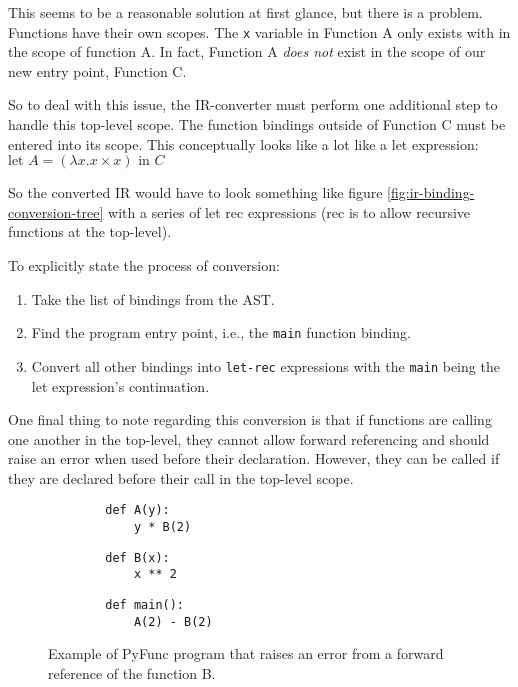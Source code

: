 \documentclass{l4proj}
\begin{document}
This seems to be a reasonable solution at first glance, but there is a problem.
Functions have their own scopes. 
The \texttt{x} variable in Function A only exists with in the scope of function A.
In fact, Function A \emph{does not} exist in the scope of our new entry point, Function C.

So to deal with this issue, the IR-converter must perform one additional step to handle this top-level scope.
The function bindings outside of Function C must be entered into its scope.
This conceptually looks like a lot like a let expression: $\text{let } A = (\lambda x. x \times x) \text{ in } C$

So the converted IR would have to look something like figure \ref{fig:ir-binding-conversion-tree} with a series of let rec expressions (rec is to allow recursive functions at the top-level).

To explicitly state the process of conversion:

\begin{enumerate}
    \item Take the list of bindings from the AST.
    \item Find the program entry point, i.e., the \texttt{main} function binding.
    \item Convert all other bindings into \texttt{let-rec} expressions with the \texttt{main} being the let expression's continuation.
\end{enumerate}

One final thing to note regarding this conversion is that if functions are calling one another in the top-level, they cannot allow forward referencing and should raise an error when used before their declaration.
However, they can be called if they are declared before their call in the top-level scope.

\begin{figure}
\begin{minipage}{0.3\textwidth}
    \begin{lstlisting}
        def A(y):
            y * B(2)
    \end{lstlisting}
\end{minipage}
\hfill
\begin{minipage}{0.3\textwidth}
    \begin{lstlisting}
        def B(x):
            x ** 2
    \end{lstlisting}
\end{minipage}
\hfill
\begin{minipage}{0.3\textwidth}
    \begin{lstlisting}
        def main():
            A(2) - B(2)
    \end{lstlisting}
\end{minipage}
\caption{Example of PyFunc program that raises an error from a forward reference of the function B.}
\end{figure}
\end{document}

